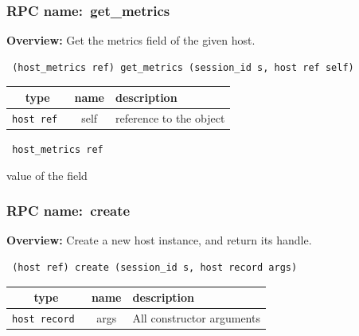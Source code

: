 \subsubsection{RPC name:~get\_metrics}

{\bf Overview:} 
Get the metrics field of the given host.

\begin{verbatim} (host_metrics ref) get_metrics (session_id s, host ref self)\end{verbatim}



 
\vspace{0.3cm}
\begin{tabular}{|c|c|p{7cm}|}
 \hline
{\bf type} & {\bf name} & {\bf description} \\ \hline
{\tt host ref } & self & reference to the object \\ \hline 

\end{tabular}

\vspace{0.3cm}

{\tt 
host\_metrics ref
}


value of the field
\vspace{0.3cm}
\vspace{0.3cm}
\vspace{0.3cm}
\subsubsection{RPC name:~create}

{\bf Overview:} 
Create a new host instance, and return its handle.

\begin{verbatim} (host ref) create (session_id s, host record args)\end{verbatim}



 
\vspace{0.3cm}
\begin{tabular}{|c|c|p{7cm}|}
 \hline
{\bf type} & {\bf name} & {\bf description} \\ \hline
{\tt host record } & args & All constructor arguments \\ \hline 

\end{tabular}


